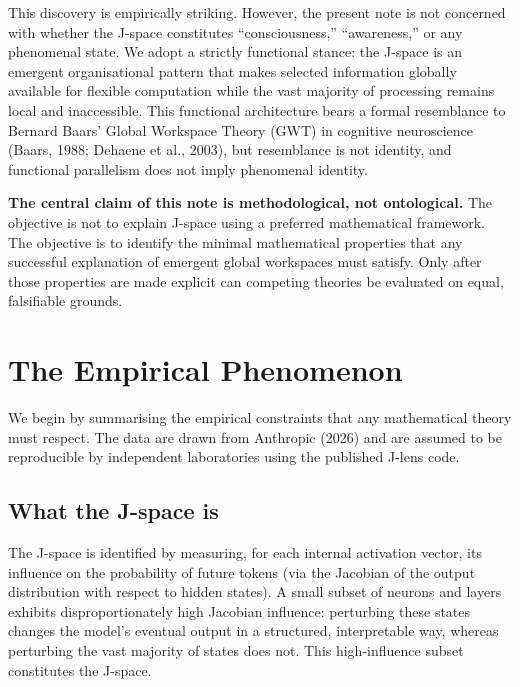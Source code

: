 \documentclass[11pt,a4paper]{article}
\theoremstyle{definition}
\begin{document}
This discovery is empirically striking. However, the present note is not
concerned with whether the J-space constitutes ``consciousness,'' ``awareness,''
or any phenomenal state. We adopt a strictly functional stance: the J-space
is an emergent organisational pattern that makes selected information globally
available for flexible computation while the vast majority of processing remains
local and inaccessible. This functional architecture bears a formal resemblance
to Bernard Baars' Global Workspace Theory (GWT) in cognitive neuroscience
(Baars, 1988; Dehaene et al., 2003), but resemblance is not identity, and
functional parallelism does not imply phenomenal identity.

\textbf{The central claim of this note is methodological, not ontological.}
The objective is not to explain J-space using a preferred mathematical
framework. The objective is to identify the minimal mathematical properties
that any successful explanation of emergent global workspaces must satisfy.
Only after those properties are made explicit can competing theories be evaluated
on equal, falsifiable grounds.

\section{The Empirical Phenomenon}
\label{sec:empirical}

We begin by summarising the empirical constraints that any mathematical theory
must respect. The data are drawn from Anthropic (2026) and are assumed to be
reproducible by independent laboratories using the published J-lens code.

\subsection{What the J-space is}

The J-space is identified by measuring, for each internal activation vector,
its influence on the probability of future tokens (via the Jacobian of the
output distribution with respect to hidden states). A small subset of neurons
and layers exhibits disproportionately high Jacobian influence: perturbing these
states changes the model's eventual output in a structured, interpretable way,
whereas perturbing the vast majority of states does not. This high-influence
subset constitutes the J-space.
\end{document}
